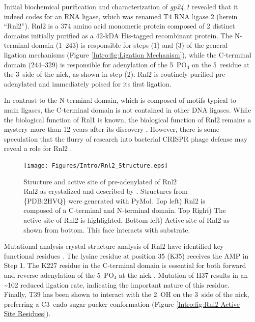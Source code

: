    Initial biochemical purification and characterization of \textit{gp24.1} \citep{Ho2002b} revealed that it indeed codes for an RNA ligase, which was renamed T4 RNA ligase 2 (herein ``Rnl2''). Rnl2 is a 374 amino acid monomeric protein composed of 2 distinct domains initially purified as a 42-kDA His-tagged recombinant protein. The N-terminal domain (1--243) is responsible for steps (1) and (3) of the general ligation mechanisms (Figure \ref{Intro:fig:Ligation Mechanism}), while the C-terminal domain (244--329) is responsible for adenylation of the 5\textprime~PO$_{4}$ on the 5\textprime~residue at the 3\textprime~side of the nick, as shown in step (2). Rnl2 is routinely purified pre-adenylated and immediately poised for its first ligation. 

    In contrast to the N-terminal domain, which is composed of motifs typical to main ligases, the C-terminal domain is not contained in other DNA ligases. While the biological function of Rnl1 is known, the biological function of Rnl2 remains a mystery more than 12 years after its discovery \citep{Chauleau2013b}. However, there is some speculation that the flurry of research into bacterial CRISPR phage defense may reveal a role for Rnl2 \citep{Barrangou2007c,Chauleau2013b}.

    \begin{figure} %
      \centering 
      \texttt{[image: Figures/Intro/Rnl2\_Structure.eps]}
      \caption[Structure and active site of pre-adenylated Rnl2]
      {
        Structure and active site of pre-adenylated of Rnl2\\[0.25cm]
        Rnl2 as crystalized and described by \citep{Nandakumar2006}. Structures from \{PDB:2HVQ\} were generated with PyMol. Top left) Rnl2 is composed of a C-terminal and N-terminal domain. Top Right) The active site of Rnl2 is highlighted. Bottom left) Active site of Rnl2 as shown from bottom. This face interacts with substrate.
        }
      \label{Intro:fig:Rnl2 General Structure}
      \end{figure}

    Mutational analysis crystal structure analysis of Rnl2 have identified key functional residues \citep{Ho2004, Nandakumar2006,Nandakumar2004a,Yin2003d}. The lysine residue at position 35 (K35) receives the AMP in Step 1. The K227 residue in the C-terminal domain is essential for both forward and reverse adenylation of the 5\textprime~PO$_4$ at the nick \citep{Viollet2011}. Mutation of H37 results in an \textasciitilde102 reduced ligation rate, indicating the important nature of this residue. Finally, T39 has been shown to interact with the 2\textprime~OH on the 3\textprime~side of the nick, preferring a C3\textprime~endo sugar pucker conformation (Figure \ref{Intro:fig:Rnl2 Active Site Residues}).

